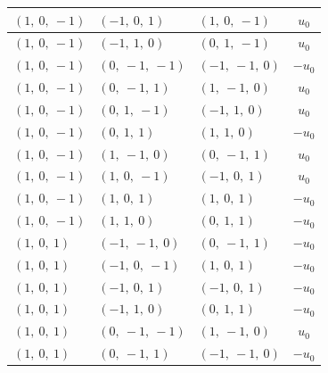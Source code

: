 \documentclass[11pt]{article}
\theoremstyle{definition}
\begin{document}
\begin{longtable}{|l|l|l|c|}
    \hline
    $\left( 1, \  0, \  -1\right)$ & $\left( -1, \  0, \  1\right)$ & $\left( 1, \  0, \  -1\right)$ & $u_{0}$ \\
    \hline
    $\left( 1, \  0, \  -1\right)$ & $\left( -1, \  1, \  0\right)$ & $\left( 0, \  1, \  -1\right)$ & $u_{0}$ \\
    \hline
    $\left( 1, \  0, \  -1\right)$ & $\left( 0, \  -1, \  -1\right)$ & $\left( -1, \  -1, \  0\right)$ & $- u_{0}$ \\
    \hline
    $\left( 1, \  0, \  -1\right)$ & $\left( 0, \  -1, \  1\right)$ & $\left( 1, \  -1, \  0\right)$ & $u_{0}$ \\
    \hline
    $\left( 1, \  0, \  -1\right)$ & $\left( 0, \  1, \  -1\right)$ & $\left( -1, \  1, \  0\right)$ & $u_{0}$ \\
    \hline
    $\left( 1, \  0, \  -1\right)$ & $\left( 0, \  1, \  1\right)$ & $\left( 1, \  1, \  0\right)$ & $- u_{0}$ \\
    \hline
    $\left( 1, \  0, \  -1\right)$ & $\left( 1, \  -1, \  0\right)$ & $\left( 0, \  -1, \  1\right)$ & $u_{0}$ \\
    \hline
    $\left( 1, \  0, \  -1\right)$ & $\left( 1, \  0, \  -1\right)$ & $\left( -1, \  0, \  1\right)$ & $u_{0}$ \\
    \hline
    $\left( 1, \  0, \  -1\right)$ & $\left( 1, \  0, \  1\right)$ & $\left( 1, \  0, \  1\right)$ & $- u_{0}$ \\
    \hline
    $\left( 1, \  0, \  -1\right)$ & $\left( 1, \  1, \  0\right)$ & $\left( 0, \  1, \  1\right)$ & $- u_{0}$ \\
    \hline
    $\left( 1, \  0, \  1\right)$ & $\left( -1, \  -1, \  0\right)$ & $\left( 0, \  -1, \  1\right)$ & $- u_{0}$ \\
    \hline
    $\left( 1, \  0, \  1\right)$ & $\left( -1, \  0, \  -1\right)$ & $\left( 1, \  0, \  1\right)$ & $- u_{0}$ \\
    \hline
    $\left( 1, \  0, \  1\right)$ & $\left( -1, \  0, \  1\right)$ & $\left( -1, \  0, \  1\right)$ & $- u_{0}$ \\
    \hline
    $\left( 1, \  0, \  1\right)$ & $\left( -1, \  1, \  0\right)$ & $\left( 0, \  1, \  1\right)$ & $- u_{0}$ \\
    \hline
    $\left( 1, \  0, \  1\right)$ & $\left( 0, \  -1, \  -1\right)$ & $\left( 1, \  -1, \  0\right)$ & $u_{0}$ \\
    \hline
    $\left( 1, \  0, \  1\right)$ & $\left( 0, \  -1, \  1\right)$ & $\left( -1, \  -1, \  0\right)$ & $- u_{0}$ \\

\end{longtable}
\end{document}
